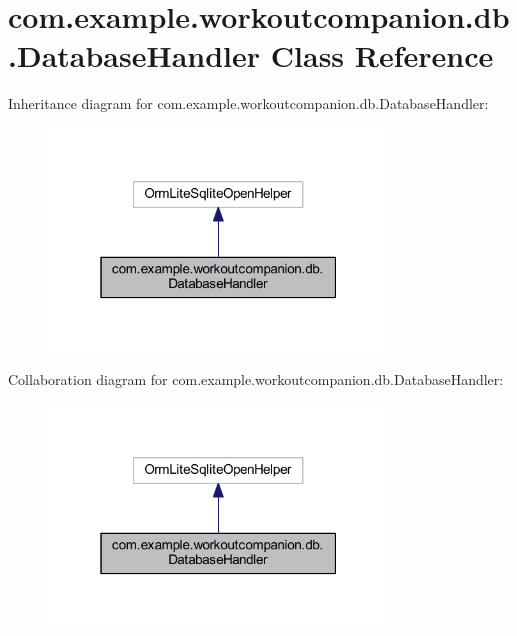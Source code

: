 \hypertarget{classcom_1_1example_1_1workoutcompanion_1_1db_1_1_database_handler}{\section{com.\-example.\-workoutcompanion.\-db.\-Database\-Handler Class Reference}
\label{classcom_1_1example_1_1workoutcompanion_1_1db_1_1_database_handler}
}


Inheritance diagram for com.\-example.\-workoutcompanion.\-db.\-Database\-Handler\-:
\nopagebreak
\begin{figure}[H]
\begin{center}
\leavevmode
\includegraphics[width=256pt]{classcom_1_1example_1_1workoutcompanion_1_1db_1_1_database_handler__inherit__graph}
\end{center}
\end{figure}


Collaboration diagram for com.\-example.\-workoutcompanion.\-db.\-Database\-Handler\-:
\nopagebreak
\begin{figure}[H]
\begin{center}
\leavevmode
\includegraphics[width=256pt]{classcom_1_1example_1_1workoutcompanion_1_1db_1_1_database_handler__coll__graph}
\end{center}
\end{figure}
